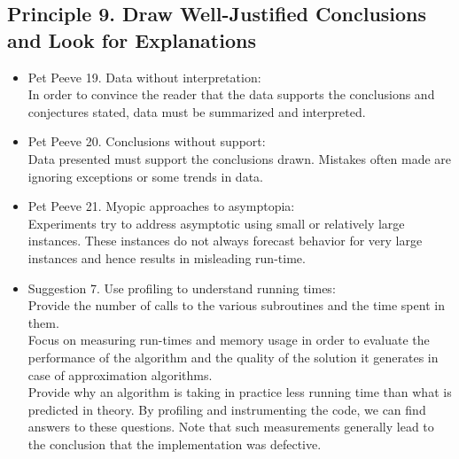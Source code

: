 \documentclass[]{scrartcl}
\begin{document}
\subsection*{Principle 9. Draw Well-Justified Conclusions and Look for Explanations}
\begin{itemize}
	\item Pet Peeve 19. Data without interpretation: \\
	In order to convince the reader that the data supports the conclusions and conjectures stated, data must be summarized and interpreted. 
	\item Pet Peeve 20. Conclusions without support: \\
	Data presented must support the conclusions drawn. Mistakes often made are ignoring exceptions or some trends in data. 
	\item Pet Peeve 21. Myopic approaches to asymptopia: \\
	Experiments try to address asymptotic using small or relatively large instances. These instances do not always forecast behavior for very large instances and hence results in misleading run-time.  
	\item Suggestion 7. Use profiling to understand running times: \\
	Provide the number of calls to the various subroutines and the time spent in them. \\ Focus on measuring run-times and memory usage in order to evaluate the performance of the algorithm and the quality of the solution it generates in case of approximation algorithms. \\
	Provide why an algorithm is taking in practice less running time than what is predicted in theory. By profiling and instrumenting the code, we can find answers to these questions. Note that such measurements generally lead to the conclusion that the implementation was defective.	 
\end{itemize}
\end{document}
